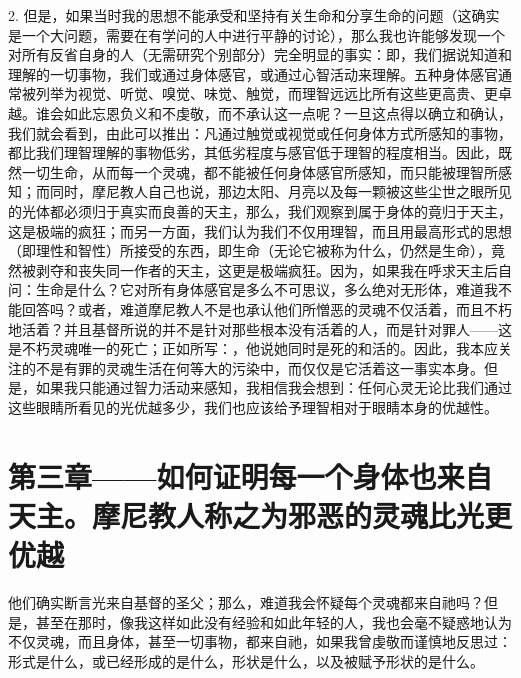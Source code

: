2. 但是，如果当时我的思想不能承受和坚持有关生命和分享生命的问题（这确实是一个大问题，需要在有学问的人中进行平静的讨论），那么我也许能够发现一个对所有反省自身的人（无需研究个别部分）完全明显的事实：即，我们据说知道和理解的一切事物，我们或通过身体感官，或通过心智活动来理解。五种身体感官通常被列举为视觉、听觉、嗅觉、味觉、触觉，而理智远远比所有这些更高贵、更卓越。谁会如此忘恩负义和不虔敬，而不承认这一点呢？一旦这点得以确立和确认，我们就会看到，由此可以推出：凡通过触觉或视觉或任何身体方式所感知的事物，都比我们理智理解的事物低劣，其低劣程度与感官低于理智的程度相当。因此，既然一切生命，从而每一个灵魂，都不能被任何身体感官所感知，而只能被理智所感知；而同时，摩尼教人自己也说，那边太阳、月亮以及每一颗被这些尘世之眼所见的光体都必须归于真实而良善的天主，那么，我们观察到属于身体的竟归于天主，这是极端的疯狂；而另一方面，我们认为我们不仅用理智，而且用最高形式的思想（即理性和智性）所接受的东西，即生命（无论它被称为什么，仍然是生命），竟然被剥夺和丧失同一作者的天主，这更是极端疯狂。因为，如果我在呼求天主后自问：生命是什么？它对所有身体感官是多么不可思议，多么绝对无形体，难道我不能回答吗？或者，难道摩尼教人不是也承认他们所憎恶的灵魂不仅活着，而且不朽地活着？并且基督所说的并不是针对那些根本没有活着的人，而是针对罪人——这是不朽灵魂唯一的死亡；正如所写：，他说她同时是死的和活的。因此，我本应关注的不是有罪的灵魂生活在何等大的污染中，而仅仅是它活着这一事实本身。但是，如果我只能通过智力活动来感知，我相信我会想到：任何心灵无论比我们通过这些眼睛所看见的光优越多少，我们也应该给予理智相对于眼睛本身的优越性。\par


\section{第三章——如何证明每一个身体也来自天主。摩尼教人称之为邪恶的灵魂比光更优越}

他们确实断言光来自基督的圣父；那么，难道我会怀疑每个灵魂都来自祂吗？但是，甚至在那时，像我这样如此没有经验和如此年轻的人，我也会毫不疑惑地认为不仅灵魂，而且身体，甚至一切事物，都来自祂，如果我曾虔敬而谨慎地反思过：形式是什么，或已经形成的是什么，形状是什么，以及被赋予形状的是什么。\par

